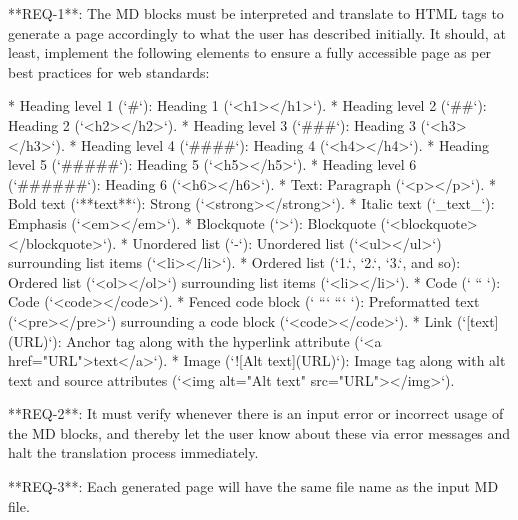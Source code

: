 \documentclass[11pt]{article}
\begin{document}
    \begin{markdown}
        **REQ-1**: The MD blocks must be interpreted and translate to HTML tags to generate a page accordingly to what the user
        has described initially. It should, at least, implement the following elements to ensure a fully accessible page as per
        best practices for web standards:

        * Heading level 1 (`#`): Heading 1 (`<h1></h1>`).
        * Heading level 2 (`##`): Heading 2 (`<h2></h2>`).
        * Heading level 3 (`###`): Heading 3 (`<h3></h3>`).
        * Heading level 4 (`####`): Heading 4 (`<h4></h4>`).
        * Heading level 5 (`#####`): Heading 5 (`<h5></h5>`).
        * Heading level 6 (`######`): Heading 6 (`<h6></h6>`).
        * Text: Paragraph (`<p></p>`).
        * Bold text (`**text**`): Strong (`<strong></strong>`).
        * Italic text (`_text_`): Emphasis (`<em></em>`).
        * Blockquote (`>`): Blockquote (`<blockquote></blockquote>`).
        * Unordered list (`-`): Unordered list (`<ul></ul>`) surrounding list items (`<li></li>`).
        * Ordered list (`1.`, `2.`, `3.`, and so): Ordered list (`<ol></ol>`) surrounding list items (`<li></li>`).
        * Code (` `` `): Code (`<code></code>`).
        * Fenced code block (` ``` ``` `): Preformatted text (`<pre></pre>`) surrounding a code block (`<code></code>`).
        * Link (`[text](URL)`): Anchor tag along with the hyperlink attribute (`<a href="URL">text</a>`).
        * Image (`![Alt text](URL)`): Image tag along with alt text and source
        attributes (`<img alt="Alt text" src="URL"></img>`).

        **REQ-2**: It must verify whenever there is an input error or incorrect usage of the MD blocks, and thereby let the user
        know about these via error messages and halt the translation process immediately.

        **REQ-3**: Each generated page will have the same file name as the input MD file.
    \end{markdown}
\end{document}
